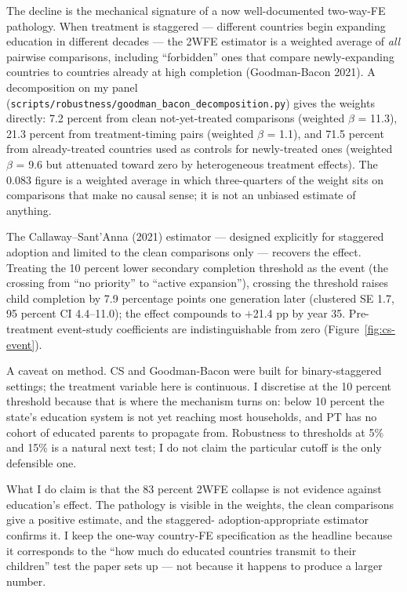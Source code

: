 \documentclass[12pt,letterpaper]{article}
\begin{document}
{The decline is the mechanical signature of a now well-documented
two-way-FE pathology. When treatment is staggered --- different
countries begin expanding education in different decades --- the 2WFE
estimator is a weighted average of \emph{all} pairwise comparisons,
including ``forbidden'' ones that compare newly-expanding countries
to countries already at high completion (Goodman-Bacon 2021). A
decomposition on my panel
(\texttt{scripts/robustness/goodman\_bacon\_decomposition.py}) gives
the weights directly: 7.2 percent from clean not-yet-treated
comparisons (weighted $\beta$ = 11.3), 21.3 percent from
treatment-timing pairs (weighted $\beta$ = 1.1), and 71.5 percent
from already-treated countries used as controls for newly-treated
ones (weighted $\beta$ = 9.6 but attenuated toward zero by
heterogeneous treatment effects). The 0.083 figure is a weighted
average in which three-quarters of the weight sits on comparisons
that make no causal sense; it is not an unbiased estimate of anything.

The Callaway--Sant'Anna (2021) estimator --- designed explicitly for
staggered adoption and limited to the clean comparisons only ---
recovers the effect. Treating the 10 percent lower secondary
completion threshold as the event (the crossing from ``no priority''
to ``active expansion''), crossing the threshold raises child
completion by 7.9 percentage points one generation later (clustered
SE 1.7, 95 percent CI 4.4--11.0); the effect compounds to
$+$21.4 pp by year 35. Pre-treatment event-study coefficients are
indistinguishable from zero (Figure~\ref{fig:cs-event}).

A caveat on method. CS and Goodman-Bacon were built for
binary-staggered settings; the treatment variable here is continuous.
I discretise at the 10 percent threshold because that is where the
mechanism turns on: below 10 percent the state's education system is
not yet reaching most households, and PT has no cohort of educated
parents to propagate from. Robustness to thresholds at 5\% and 15\% is
a natural next test; I do not claim the particular cutoff is the only
defensible one.

What I do claim is that the 83 percent 2WFE collapse is not evidence
against education's effect. The pathology is visible in the weights,
the clean comparisons give a positive estimate, and the staggered-
adoption-appropriate estimator confirms it. I keep the one-way
country-FE specification as the headline because it corresponds to
the ``how much do educated countries transmit to their children'' test
the paper sets up --- not because it happens to produce a larger
number.

}
\end{document}
